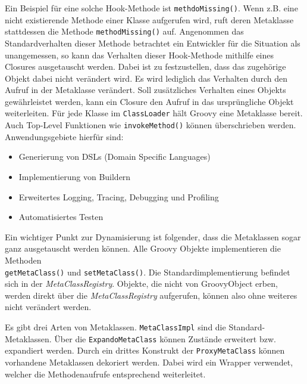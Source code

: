 Ein Beispiel für eine solche Hook-Methode ist \texttt{methdoMissing()}. Wenn z.B. eine nicht existierende Methode einer Klasse aufgerufen wird, ruft deren Metaklasse stattdessen die Methode \texttt{methodMissing()} auf.
Angenommen das Standardverhalten dieser Methode betrachtet ein Entwickler für die Situation als unangemessen, so kann das Verhalten dieser Hook-Methode mithilfe eines Closures ausgetauscht werden. 
Dabei ist zu festzustellen, dass das zugehörige Objekt dabei nicht verändert wird. 
Es wird lediglich das Verhalten durch den Aufruf in der Metaklasse verändert. 
Soll zusätzliches Verhalten eines Objekts gewährleistet werden, kann ein Closure den Aufruf in das ursprüngliche Objekt weiterleiten.
Für jede Klasse im \texttt{ClassLoader} hält Groovy eine Metaklasse bereit. Auch Top-Level Funktionen wie \texttt{invokeMethod()} können überschrieben werden.
Anwendungsgebiete hierfür sind:

\begin{itemize}[nosep]
	\item Generierung von DSLs (Domain Specific Languages)
	\item Implementierung von Buildern
	\item Erweitertes Logging, Tracing, Debugging und Profiling
	\item Automatisiertes Testen
\end{itemize}

Ein wichtiger Punkt zur Dynamisierung ist folgender, dass die Metaklassen sogar ganz ausgetauscht werden können.
Alle Groovy Objekte implementieren die Methoden\\ \texttt{getMetaClass()} und \texttt{setMetaClass()}. 
Die Standardimplementierung befindet sich in der \textit{MetaClassRegistry}. 
Objekte, die nicht von GroovyObject erben, werden direkt über die \textit{MetaClassRegistry} aufgerufen, können also ohne weiteres nicht verändert werden. 

Es gibt drei Arten von Metaklassen. \texttt{MetaClassImpl} sind die Standard-Metaklassen.
Über die \texttt{ExpandoMetaClass} können Zustände erweitert bzw. expandiert werden. 
Durch ein drittes Konstrukt der \texttt{ProxyMetaClass} können vorhandene Metaklassen dekoriert werden. 
Dabei wird ein Wrapper verwendet, welcher die Methodenaufrufe entsprechend weiterleitet.



